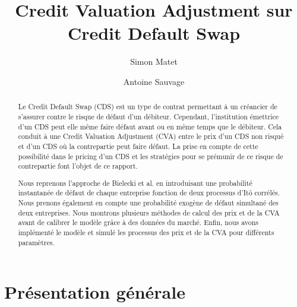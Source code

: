 \documentclass[a4paper]{article}
\title{Credit Valuation Adjustment sur Credit Default Swap}           %
\author{Simon Matet \and Antoine Sauvage}
\date{}                       %
\theoremstyle{definition}
\theoremstyle{remark}
\begin{document}
\maketitle                    %

\begin{abstract}
Le Credit Default Swap (CDS) est un type de contrat permettant à un créancier de s'assurer contre le risque de défaut d'un débiteur. Cependant, l'institution émettrice d'un CDS peut elle même faire défaut avant ou en même temps que le débiteur. Cela conduit à une Credit Valuation Adjustment (CVA) entre le prix d'un CDS non risqué et d'un CDS où la contrepartie peut faire défaut. La prise en compte de cette possibilité dans le pricing d'un CDS et les stratégies pour se prémunir de ce risque de contrepartie font l'objet de ce rapport.

Nous reprenons l'approche de Bielecki et al. \cite{A} en introduisant une probabilité instantanée de défaut de chaque entreprise fonction de  deux processus d'Itô corrélés. Nous prenons également en compte une probabilité exogène de défaut simultané des deux entreprises. Nous montrons plusieurs méthodes de calcul des prix et de la CVA avant de calibrer le modèle grâce à des données du marché. Enfin, nous avons implémenté le modèle et simulé les processus des prix et de la CVA pour différents paramètres.

\end{abstract}

\tableofcontents              %



\section{Présentation générale}               %
\end{document}
